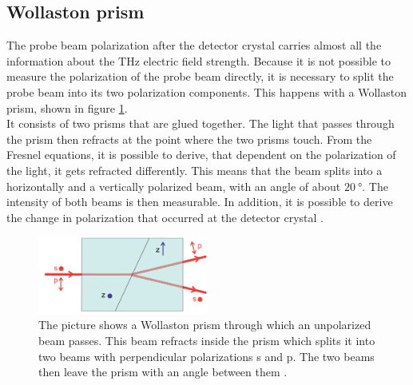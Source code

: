 \subsection{Wollaston prism}
\label{sec:wollaston}
The probe beam polarization after the detector crystal carries almost all the information about the $\si{\tera\hertz}$ electric field strength.
Because it is not possible to measure the polarization of the probe beam directly, it is necessary to split the probe beam into its two polarization components.
This happens with a Wollaston prism, shown in figure \ref{fig:wollaston}.
\\
It consists of two prisms that are glued together.
The light that passes through the prism then refracts at the point where the two prisms touch.
From the Fresnel equations, it is possible to derive, that dependent on the polarization of the light, it gets refracted differently.
This means that the beam splits into a horizontally and a vertically polarized beam, with an angle of about $\SI{20}{\degree}$.
The intensity of both beams is then measurable.
In addition, it is possible to derive the change in polarization that occurred at the detector crystal \cite{wollaston_prism}. 
\begin{figure}
    \centering
    \includegraphics[width=0.5\textwidth]{Plots/wollaston_prism.png}
    \caption{The picture shows a Wollaston prism through which an unpolarized beam passes.
    This beam refracts inside the prism which splits it into two beams with perpendicular polarizations s and p.
    The two beams then leave the prism with an angle between them \cite{wollaston_prism}.}
    \label{fig:wollaston}
\end{figure}

